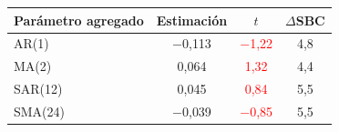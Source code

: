 \begin{tabular}{lccc}
\toprule
Par\'ametro agregado & Estimaci\'on & $t$ & $\Delta$SBC
\\ \midrule
AR(1) & \ensuremath{-}0{,}113 & \textcolor{red}{\ensuremath{-}1{,}22} & 4{,}8 \\
MA(2) & 0{,}064 & \textcolor{red}{1{,}32} & 4{,}4 \\
SAR(12) & 0{,}045 & \textcolor{red}{0{,}84} & 5{,}5 \\
SMA(24) & \ensuremath{-}0{,}039 & \textcolor{red}{\ensuremath{-}0{,}85} & 5{,}5 \\
\bottomrule
\end{tabular}
